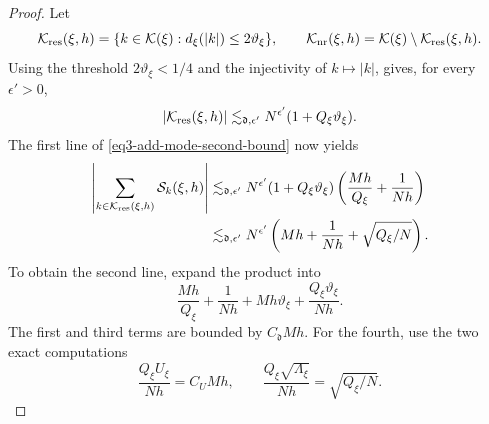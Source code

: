 \documentclass[reqno,12pt]{amsart}
\numberwithin{equation}{section}
\begin{document}
\begin{proof}
Let
\[
 \mathcal K_{\rm res}(\xi,h)
   =\{k\in\mathcal K(\xi):d_\xi(|k|)\le2\vartheta_\xi\},
 \qquad
 \mathcal K_{\rm nr}(\xi,h)=\mathcal K(\xi)\setminus\mathcal K_{\rm res}(\xi,h).
\]
Using the threshold $2\vartheta_\xi<1/4$ and the injectivity of
$k\mapsto|k|$,  gives, for every
$\epsilon'>0$,
\begin{equation}
 |\mathcal K_{\rm res}(\xi,h)|
 \lesssim_{\mathfrak d,\epsilon'}N^{\epsilon'}
                                      (1+Q_\xi\vartheta_\xi).
 \label{eq3-add-resonant-count-used}
\end{equation}
The first line of \eqref{eq3-add-mode-second-bound} now yields
\begin{equation}
 \begin{split}
 \left|\sum_{k\in\mathcal K_{\rm res}(\xi,h)}\mathcal S_k(\xi,h)\right|
 &\lesssim_{\mathfrak d,\epsilon'}N^{\epsilon'}
        (1+Q_\xi\vartheta_\xi)
        \left(\frac{Mh}{Q_\xi}+\frac1{Nh}\right)\\
 &\lesssim_{\mathfrak d,\epsilon'}N^{\epsilon'}
        \left(Mh+\frac1{Nh}+\sqrt{Q_\xi/N}\right).
 \end{split}
 \label{eq3-add-resonant-total}
\end{equation}
To obtain the second line, expand the product into
\[
 \frac{Mh}{Q_\xi}+\frac1{Nh}+Mh\vartheta_\xi
                            +\frac{Q_\xi\vartheta_\xi}{Nh}.
\]
The first and third terms are bounded by $C_{\mathfrak d}Mh$.
For the fourth, use the two exact computations
\[
 \frac{Q_\xi U_\xi}{Nh}=C_U Mh,
 \qquad
 \frac{Q_\xi\sqrt{\Lambda_\xi}}{Nh}=\sqrt{Q_\xi/N}.
\]


\end{proof}
\end{document}
